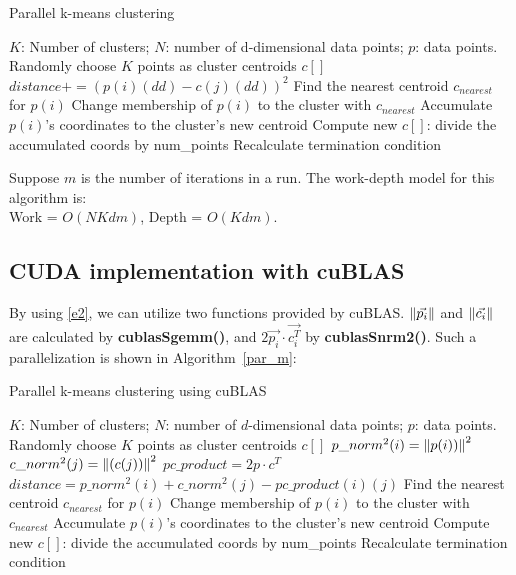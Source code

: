 \begin{algorithm}[!h]
  \caption{Parallel k-means clustering} \label{par}
  \begin{algorithmic}[1]
    \INPUT $K$: Number of clusters; $N$: number of d-dimensional data points; $p$: data points.
     \label{alg:p}
    \State Randomly choose $K$ points as cluster centroids $c[]$
    \State $distance += (p(i)(dd) - c(j)(dd))^2$
    \EndFor
    \EndFor
    \State Find the nearest centroid $c_{nearest}$ for $p(i)$
    \State Change membership of $p(i)$ to the cluster with $c_{nearest}$
    \State Accumulate $p(i)$'s coordinates to the cluster's new centroid
    \EndParFor
    \State Compute new $c[]$: divide the accumulated coords by num\_points
    \State Recalculate termination condition
    \EndWhile
    \EndFunction  
  \end{algorithmic}
\end{algorithm}

\vspace{5mm}
\noindent
Suppose $m$ is the number of iterations in a run. The work-depth model for this algorithm is: \\
Work = $O(NKdm)$, Depth = $O(Kdm)$.



\subsection{CUDA implementation with cuBLAS}
\label{ss:cublas}

By using \ref{e2}, we can utilize two functions provided by cuBLAS.
$\left\lVert\vec{p_i}\right\rVert$ and $\left\lVert\vec{c_i}\right\rVert$ are calculated by \textbf{cublasSgemm()},
and $2\vec{p_i} \cdot \vec{c_i^T}$ by \textbf{cublasSnrm2()}.
Such a parallelization is shown in Algorithm~\ref{par_m}:

\begin{algorithm}[!h]
  \caption{Parallel k-means clustering using cuBLAS} \label{par_m}
  \begin{algorithmic}[1]
    \INPUT $K$: Number of clusters; $N$: number of $d$-dimensional data points; $p$: data points.
     \label{alg:pm}
    \State Randomly choose $K$ points as cluster centroids $c[]$
    \State $p\_norm^2(i) = \left\lVert p(i))\right\rVert^2$
    \EndFor
    \State $c\_norm^2(j) = \left\lVert(c(j))\right\rVert^2$
    \EndFor
    \State $pc\_product = 2 p \cdot c^T$
    \State $distance = p\_norm^2(i) + c\_norm^2(j) - pc\_product(i)(j)$
    \EndFor
    \State Find the nearest centroid $c_{nearest}$ for $p(i)$
    \State Change membership of $p(i)$ to the cluster with $c_{nearest}$
    \State Accumulate $p(i)$'s coordinates to the cluster's new centroid
    \EndParFor
    \State Compute new $c[]$: divide the accumulated coords by num\_points
    \State Recalculate termination condition
    \EndWhile
    \EndFunction
  \end{algorithmic}
\end{algorithm}

